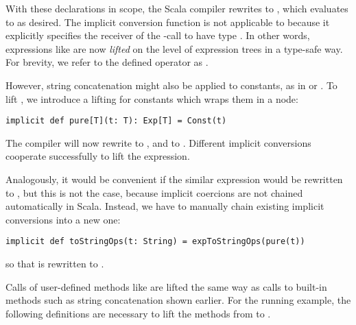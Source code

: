 With these declarations in scope, the Scala compiler rewrites  to
\codebreak{}, which evaluates to  as desired.
The implicit conversion function  is not applicable to  because it explicitly specifies the receiver of the \code{+}-call to have type .
In other words, expressions like  are now \emph{lifted} on the level of expression trees in a type-safe way. For brevity, we refer to the defined operator as .

However, string concatenation might also be applied to constants, as in  or .
To lift , we introduce a lifting for constants which wraps them in a  node:

\begin{lstlisting}
implicit def pure[T](t: T): Exp[T] = Const(t)
\end{lstlisting}

The compiler will now rewrite  to , and
\linebreak{} to .
Different implicit conversions cooperate successfully to lift the expression.

Analogously, it would be convenient if the similar expression  would be rewritten to , but this is not the case, because implicit coercions are not chained automatically in Scala.
Instead, we have to manually chain existing implicit conversions into a new one:
\begin{lstlisting}
implicit def toStringOps(t: String) = expToStringOps(pure(t))
\end{lstlisting}
so that  is rewritten to .

Calls of user-defined methods like  are lifted the same way as calls to built-in methods such as string concatenation shown earlier. For the running example, the following definitions are necessary to lift the methods from  to .

